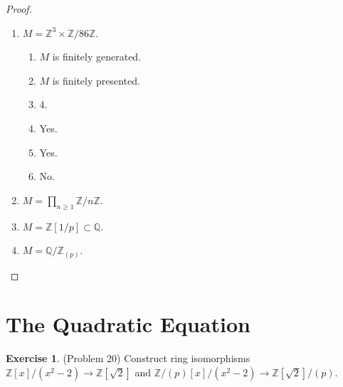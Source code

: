 \documentclass[12pt, psamsfonts]{amsart}
\theoremstyle{definition}
\newtheorem*{exer}{Exercise}
\theoremstyle{remark}
\numberwithin{equation}{section}
\begin{document}
\begin{proof}
$ $
  \begin{enumerate}[label=(\alph*)]
    \item 
      $M = \mathbb{Z}^3 \times \mathbb{Z} / 86\mathbb{Z}$.
      \begin{enumerate}[label=(\roman*)]
        \item 
          $M$ is finitely generated.
        \item
          $M$ is finitely presented.
        \item
          4.
        \item
          Yes.
        \item
          Yes.
        \item
          No.
      \end{enumerate}
    \item 
      $M = \prod_{n \geq 1} \mathbb{Z} / n\mathbb{Z}$.
    \item 
      $M = \mathbb{Z}[1/p] \subset \mathbb{Q}$.
    \item 
      $M = \mathbb{Q} / \mathbb{Z}_{(p)}$.
  \end{enumerate}
\end{proof}

\section{The Quadratic Equation}

\begin{exer}{(Problem 20)}
  Construct ring isomorphisms $\mathbb{Z}[x]/(x^2 - 2) \rightarrow \mathbb{Z}[\sqrt{2}]$ and $\mathbb{Z}/(p)[x]/(x^2 - 2) \rightarrow \mathbb{Z}[\sqrt{2}]/(p)$.
\end{exer}
\end{document}
